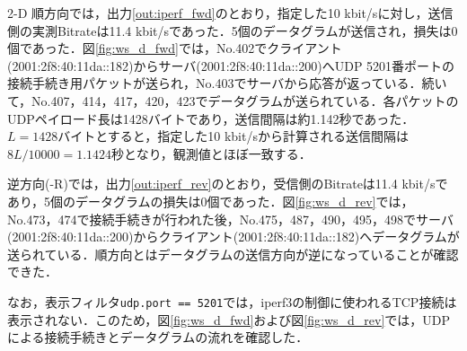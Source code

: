 \begin{maintask}{2-D}
    順方向では，出力\ref{out:iperf_fwd}のとおり，指定した10 kbit/sに対し，送信側の実測Bitrateは11.4 kbit/sであった．5個のデータグラムが送信され，損失は0個であった．図\ref{fig:ws_d_fwd}では，No.402でクライアント(2001:2f8:40:11da::182)からサーバ(2001:2f8:40:11da::200)へUDP 5201番ポートの接続手続き用パケットが送られ，No.403でサーバから応答が返っている．続いて，No.407，414，417，420，423でデータグラムが送られている．各パケットのUDPペイロード長は1428バイトであり，送信間隔は約1.142秒であった．$L=1428$バイトとすると，指定した10 kbit/sから計算される送信間隔は$8L/10000=1.1424$秒となり，観測値とほぼ一致する．

  逆方向(-R)では，出力\ref{out:iperf_rev}のとおり，受信側のBitrateは11.4 kbit/sであり，5個のデータグラムの損失は0個であった．図\ref{fig:ws_d_rev}では，No.473，474で接続手続きが行われた後，No.475，487，490，495，498でサーバ(2001:2f8:40:11da::200)からクライアント(2001:2f8:40:11da::182)へデータグラムが送られている．順方向とはデータグラムの送信方向が逆になっていることが確認できた．

  なお，表示フィルタ\texttt{udp.port == 5201}では，iperf3の制御に使われるTCP接続は表示されない．このため，図\ref{fig:ws_d_fwd}および図\ref{fig:ws_d_rev}では，UDPによる接続手続きとデータグラムの流れを確認した．
\end{maintask}
